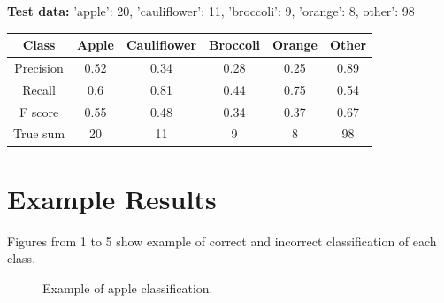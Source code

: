\documentclass[a4paper, 11pt]{article}
\begin{document}
\textbf{Test data:}
'apple': 20, 'cauliflower': 11, 'broccoli': 9, 'orange': 8, other': 98

\begin{tabular}{|c|c|c|c|c|c|}
\hline 
Class & Apple & Cauliflower & Broccoli & Orange & Other \\ 
\hline 
Precision & 0.52 & 0.34 & 0.28 & 0.25 & 0.89 \\ 
\hline 
Recall & 0.6 & 0.81 & 0.44 & 0.75 & 0.54 \\ 
\hline 
F score & 0.55 & 0.48 & 0.34 & 0.37 & 0.67 \\ 
\hline 
True sum & 20 & 11 & 9 & 8 & 98 \\ 
\hline 
\end{tabular} 


\section*{Example Results}

Figures from 1 to 5 show example of correct and incorrect classification of each class.

\begin{figure}[!htbp]
  \centering
  \hfill
  \hfill
  \caption{Example of apple classification.}
\end{figure}
\end{document}
